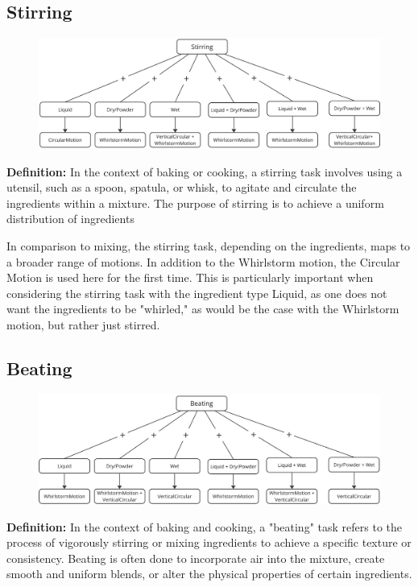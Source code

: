 \subsection{Stirring}
\begin{figure}[H]
    \includegraphics[scale=0.18]{Graphics/StirringDeisionTree.jpg}
    \end{figure}
\textbf{Definition:}
In the context of baking or cooking, a stirring task involves using a utensil, such as a spoon, spatula, or whisk, to agitate and circulate the ingredients within a mixture. The purpose of stirring is to achieve a uniform distribution of ingredients

In comparison to mixing, the stirring task, depending on the ingredients, maps to a broader range of motions. In addition to the Whirlstorm motion, the Circular Motion is used here for the first time. This is particularly important when considering the stirring task with the ingredient type Liquid, as one does not want the ingredients to be "whirled," as would be the case with the Whirlstorm motion, but rather just stirred.
\subsection{Beating}
\begin{figure}[H]
    \includegraphics[scale=0.18]{Graphics/BeatingDecisionTree.jpg}
    \end{figure}
\textbf{Definition:}
In the context of baking and cooking, a "beating" task refers to the process of vigorously stirring or mixing ingredients to achieve a specific texture or consistency. Beating is often done to incorporate air into the mixture, create smooth and uniform blends, or alter the physical properties of certain ingredients.

